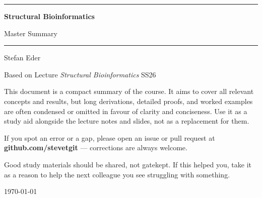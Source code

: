 \documentclass[11pt, oneside]{book}
\newcommand{\coursetitle}{Structural Bioinformatics}
\newcommand{\documenttype}{Master Summary}
\newcommand{\authorname}{Stefan Eder}
\newcommand{\basedon}{Based on Lecture \emph{Structural Bioinformatics} SS26}
\begin{document}
\frontmatter  %


\thispagestyle{empty}
\vspace*{1.8cm}

\begin{center}
  {\color{accent}\rule{\linewidth}{1.8pt}}
  \vspace{0.65cm}

  {\fontsize{28}{34}\selectfont\bfseries\color{accent}\coursetitle\par}
  \vspace{0.25cm}
  {\large\color{gray!80!black}\documenttype\par}

  \vspace{0.55cm}
  {\color{accent!35}\rule{\linewidth}{0.5pt}}
  \vspace{0.55cm}

  {\large\authorname\par}
  \vspace{0.2cm}
  {\small\color{gray!70}\basedon\par}
\end{center}

\vspace{1.6cm}

\begin{center}
\begin{minipage}{0.84\textwidth}
  \small\color{gray!80!black}
  This document is a compact summary of the course.
  It aims to cover all relevant concepts and results, but long derivations,
  detailed proofs, and worked examples are often condensed or omitted in
  favour of clarity and conciseness.
  Use it as a study aid alongside the lecture notes and slides, not as a
  replacement for them.

  \medskip
  If you spot an error or a gap, please open an issue or pull request at
  \textbf{github.com/stevetgit} --- corrections are always welcome.

  \medskip
  \color{gray!60!black}
  Good study materials should be shared, not gatekept.
  If this helped you, take it as a reason to help the next colleague you see struggling with something.
\end{minipage}
\end{center}

\vfill
{\centering\small\color{gray!65} \today\par}
\clearpage
\end{document}

